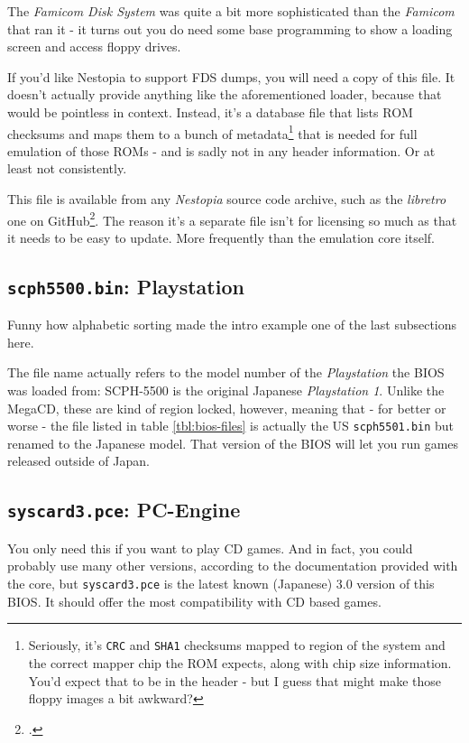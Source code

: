 \documentclass[a4paper]{article}
\begin{document}
The \emph{Famicom Disk System} was quite a bit more sophisticated than the \emph{Famicom} that ran it - it turns out you do need some base programming to show a loading screen and access floppy drives.

If you'd like Nestopia to support FDS dumps, you will need a copy of this file. It doesn't actually provide anything like the aforementioned loader, because that would be pointless in context. Instead, it's a database file that lists ROM checksums and maps them to a bunch of metadata\footnote{Seriously, it's \texttt{CRC} and \texttt{SHA1} checksums mapped to region of the system and the correct mapper chip the ROM expects, along with chip size information. You'd expect that to be in the header - but I guess that might make those floppy images a bit awkward?} that is needed for full emulation of those ROMs - and is sadly not in any header information. Or at least not consistently.

This file is available from any \emph{Nestopia} source code archive, such as the \emph{libretro} one on GitHub\footcite{ref:libretro-nestopia}. The reason it's a separate file isn't for licensing so much as that it needs to be easy to update. More frequently than the emulation core itself.

\subsection{\texttt{scph5500.bin}: Playstation}

Funny how alphabetic sorting made the intro example one of the last subsections here.

The file name actually refers to the model number of the \emph{Playstation} the BIOS was loaded from: SCPH-5500 is the original Japanese \emph{Playstation 1}. Unlike the MegaCD, these are kind of region locked, however, meaning that - for better or worse - the file listed in table \ref{tbl:bios-files} is actually the US \texttt{scph5501.bin} but renamed to the Japanese model. That version of the BIOS will let you run games released outside of Japan.

\subsection{\texttt{syscard3.pce}: PC-Engine}

You only need this if you want to play CD games. And in fact, you could probably use many other versions, according to the documentation provided with the core, but \texttt{syscard3.pce} is the latest known (Japanese) 3.0 version of this BIOS. It should offer the most compatibility with CD based games.
\end{document}
